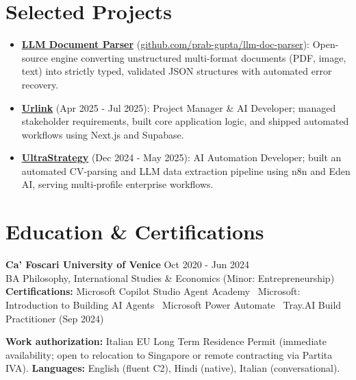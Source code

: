 \documentclass[a4paper,10pt]{article}
\begin{document}
\section{Selected Projects}
\begin{itemize}
 \item \textbf{\href{https://github.com/prab-gupta/llm-doc-parser}{LLM Document Parser}} (\href{https://github.com/prab-gupta/llm-doc-parser}{github.com/prab-gupta/llm-doc-parser}): Open-source engine converting unstructured multi-format documents (PDF, image, text) into strictly typed, validated JSON structures with automated error recovery.
 \item \textbf{\href{https://smarturlink.com/}{Urlink}} (Apr 2025 - Jul 2025): Project Manager \& AI Developer; managed stakeholder requirements, built core application logic, and shipped automated workflows using Next.js and Supabase.
 \item \textbf{\href{https://ultrastrategy.com}{UltraStrategy}} (Dec 2024 - May 2025): AI Automation Developer; built an automated CV-parsing and LLM data extraction pipeline using n8n and Eden AI, serving multi-profile enterprise workflows.
\end{itemize}

\section{Education \& Certifications}
\textbf{Ca' Foscari University of Venice} \hfill Oct 2020 - Jun 2024\\
BA Philosophy, International Studies \& Economics (Minor: Entrepreneurship)\\[1pt]
\textbf{Certifications:} Microsoft Copilot Studio Agent Academy \textbullet\ Microsoft: Introduction to Building AI Agents \textbullet\ Microsoft Power Automate \textbullet\ Tray.AI Build Practitioner (Sep 2024)

\vspace{2pt}
{\small \textbf{Work authorization:} Italian EU Long Term Residence Permit (immediate availability; open to relocation to Singapore or remote contracting via Partita IVA). \quad \textbf{Languages:} English (fluent C2), Hindi (native), Italian (conversational).}
\end{document}
